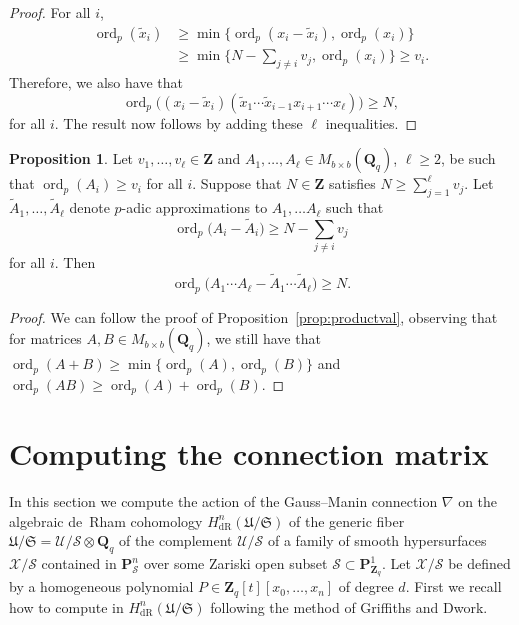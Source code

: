 \documentclass[a4paper,11pt]{article}
\numberwithin{equation}{section}
\newcommand{\ZZ}{\mathbf{Z}} %
\newcommand{\QQ}{\mathbf{Q}} %
\DeclareMathOperator{\ord}{ord}          %
\providecommand{\HdR}{H_{\text{dR}}}    %
\theoremstyle{definition}
\newtheorem{prop}[thm]{Proposition}
\begin{document}
\begin{proof}
For all $i$,
\begin{align*}
\ord_p\left(\tilde{x}_i \right) 
    & \geq \min \{ \ord_p\left(x_i-\tilde{x}_i\right), \ord_p(x_i) \} \\
    & \geq \min \biggl\{ N- \sum_{j \neq i} v_j, \ord_p(x_i)\biggr\} \geq v_i.
\end{align*}
Therefore, we also have that
\begin{equation*}
\ord_p \bigl( (x_{i}-\tilde{x}_{i})
    (\tilde{x}_1 \dotsm \tilde{x}_{i-1} x_{i+1} \dotsm x_{\ell}) \bigr) \geq N,
\end{equation*}
for all $i$. The result now follows by adding these $\ell$ inequalities.
\end{proof}

\begin{prop} \label{prop:matrixproductval}
Let $v_1,\dotsc,v_{\ell} \in \ZZ$ and 
$A_1, \dotsc, A_{\ell} \in M_{b \times b}(\QQ_q)$, $\ell \geq 2$, be 
such that $\ord_p(A_i) \geq v_i$ for all $i$. Suppose that $N \in \ZZ$ 
satisfies $N \geq \sum_{j=1}^{\ell} v_j$. 
Let $\tilde{A}_1, \dotsc, \tilde{A}_{\ell}$ denote $p$-adic approximations 
to $A_1, \dotsc A_{\ell}$ such that
\[
\ord_p\bigl(A_i - \tilde{A}_i\bigr) \geq N - \sum_{j \neq i} v_j
\]
for all $i$.  Then 
\begin{equation}
\ord_p\bigl(A_1 \dotsm A_{\ell} - \tilde{A}_1 \dotsm \tilde{A}_{\ell}\bigr) \geq N.
\end{equation}
\end{prop}

\begin{proof}
We can follow the proof of Proposition~\ref{prop:productval}, 
observing that for matrices $A,B \in M_{b \times b}(\QQ_q)$, we still 
have that $\ord_p(A + B) \geq \min \{\ord_p(A), \ord_p(B)\}$ and 
$\ord_p(AB) \geq \ord_p(A)+\ord_p(B)$.
\end{proof}

\section{Computing the connection matrix}
\label{sec:Connection}

In this section we compute the action of the Gauss--Manin connection $\nabla$ 
on the algebraic de~Rham cohomology $\HdR^{n}(\mathfrak{U}/\mathfrak{S})$ 
of the generic fiber 
$\mathfrak{U}/\mathfrak{S}=\mathcal{U}/\mathcal{S} \otimes \QQ_q$ of the 
complement $\mathcal{U}/\mathcal{S}$ of a family of smooth hypersurfaces 
$\mathcal{X}/\mathcal{S}$ contained in $\mathbf{P}^n_{\mathcal{S}}$ over
some Zariski open subset $\mathcal{S} \subset \mathbf{P}^1_{\ZZ_q}$. Let 
$\mathcal{X}/\mathcal{S}$ be defined by a homogeneous polynomial 
$P \in \ZZ_q[t][x_0,\dotsc,x_n]$ of degree $d$. First we recall how to 
compute in $\HdR^{n}(\mathfrak{U}/\mathfrak{S})$ following the method 
of Griffiths and Dwork.  
\end{document}
